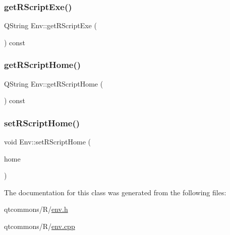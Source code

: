 \subsubsection{\texorpdfstring{getRScriptExe()}{getRScriptExe()}}
{\footnotesize\ttfamily Q\+String Env\+::get\+R\+Script\+Exe (\begin{DoxyParamCaption}{ }\end{DoxyParamCaption}) const}

\mbox{\label{classdisplace_1_1_r_1_1_env_a5981af5bec4df8c225b9af2e397950c2}} 
\subsubsection{\texorpdfstring{getRScriptHome()}{getRScriptHome()}}
{\footnotesize\ttfamily Q\+String Env\+::get\+R\+Script\+Home (\begin{DoxyParamCaption}{ }\end{DoxyParamCaption}) const}

\mbox{\label{classdisplace_1_1_r_1_1_env_ab73ed820003148ee312fb1d8302d339d}} 
\subsubsection{\texorpdfstring{setRScriptHome()}{setRScriptHome()}}
{\footnotesize\ttfamily void Env\+::set\+R\+Script\+Home (\begin{DoxyParamCaption}\item[{Q\+String}]{home }\end{DoxyParamCaption})}



The documentation for this class was generated from the following files\+:\begin{DoxyCompactItemize}
\item 
qtcommons/\+R/\mbox{\hyperlink{env_8h}{env.\+h}}\item 
qtcommons/\+R/\mbox{\hyperlink{env_8cpp}{env.\+cpp}}\end{DoxyCompactItemize}
